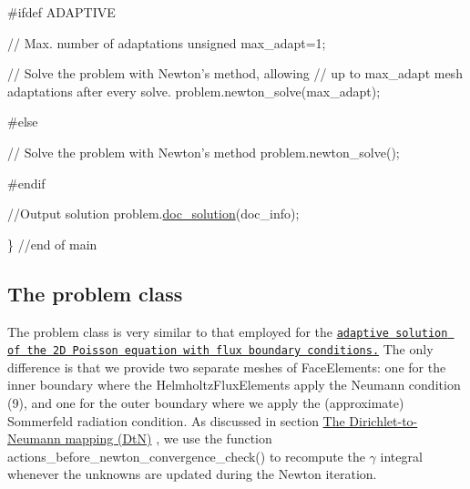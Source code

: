 \begin{DoxyCodeInclude}


\textcolor{preprocessor}{#ifdef ADAPTIVE}

 \textcolor{comment}{// Max. number of adaptations}
 \textcolor{keywordtype}{unsigned} max\_adapt=1;
 
   \textcolor{comment}{// Solve the problem with Newton's method, allowing}
   \textcolor{comment}{// up to max\_adapt mesh adaptations after every solve.}
   problem.newton\_solve(max\_adapt);

\textcolor{preprocessor}{#else}

   \textcolor{comment}{// Solve the problem with Newton's method}
   problem.newton\_solve();

\textcolor{preprocessor}{#endif}

 \textcolor{comment}{//Output solution}
 problem.\hyperlink{classScatteringProblem_af83ab14c4f4750ea17c21466f6c6364f}{doc\_solution}(doc\_info);
    
\} \textcolor{comment}{//end of main}

\end{DoxyCodeInclude}




 

\hypertarget{index_class}{}\subsection{The problem class}\label{index_class}
The problem class is very similar to that employed for the \href{../../../poisson/two_d_poisson_flux_bc_adapt/html/index.html}{\tt adaptive solution of the 2D Poisson equation with flux boundary conditions.} The only difference is that we provide two separate meshes of {\ttfamily Face\+Elements\+:} one for the inner boundary where the {\ttfamily Helmholtz\+Flux\+Elements} apply the Neumann condition (9), and one for the outer boundary where we apply the (approximate) Sommerfeld radiation condition. As discussed in section \hyperlink{index_DtN}{The Dirichlet-\/to-\/\+Neumann mapping (DtN)} , we use the function {\ttfamily actions\+\_\+before\+\_\+newton\+\_\+convergence\+\_\+check()} to recompute the $ \gamma $ integral whenever the unknowns are updated during the Newton iteration.

